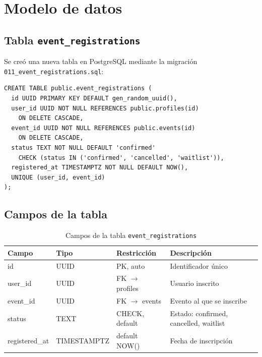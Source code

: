 
\section{Modelo de datos}

\subsection{Tabla \texttt{event\_registrations}}

Se cre\'o una nueva tabla en PostgreSQL mediante la migraci\'on
\texttt{011\_event\_registrations.sql}:

\begin{verbatim}
CREATE TABLE public.event_registrations (
  id UUID PRIMARY KEY DEFAULT gen_random_uuid(),
  user_id UUID NOT NULL REFERENCES public.profiles(id)
    ON DELETE CASCADE,
  event_id UUID NOT NULL REFERENCES public.events(id)
    ON DELETE CASCADE,
  status TEXT NOT NULL DEFAULT 'confirmed'
    CHECK (status IN ('confirmed', 'cancelled', 'waitlist')),
  registered_at TIMESTAMPTZ NOT NULL DEFAULT NOW(),
  UNIQUE (user_id, event_id)
);
\end{verbatim}

\subsection{Campos de la tabla}

\begin{table}[H]
\centering
\begin{tabular}{@{}lllp{5cm}@{}}
\toprule
\textbf{Campo} & \textbf{Tipo} & \textbf{Restricci\'on} &
  \textbf{Descripci\'on} \\
\midrule
id & UUID & PK, auto & Identificador \'unico \\
user_id & UUID & FK $\to$ profiles & Usuario inscrito \\
event_id & UUID & FK $\to$ events & Evento al que se inscribe \\
status & TEXT & CHECK, default & Estado: confirmed, cancelled,
  waitlist \\
registered_at & TIMESTAMPTZ & default NOW() & Fecha de inscripci\'on \\
\bottomrule
\end{tabular}
\caption{Campos de la tabla \texttt{event\_registrations}}
\end{table}

